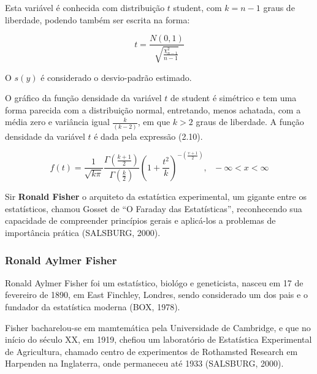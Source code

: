 Esta variável é conhecida com distribuição $t$ student, com $k=n-1$ graus de liberdade, podendo também ser escrita na forma:

\begin{equation}
    t =\frac{N(0,1)}{\sqrt{\frac{\chi^{2}_{n-1}}{n-1}}}
\end{equation}

O $s(y)$ é considerado o desvio-padrão estimado.\vskip0.3cm

O gráfico da função densidade da variável $t$ de student é simétrico e tem uma forma parecida com a distribuição normal, entretando, menos achatada, com a média zero e variância igual $\frac{k}{(k-2)}$, em que $k>2$ graus de liberdade. A função densidade da variável $t$ é dada pela expressão (2.10). 

\begin{equation}
f\left(t\right)=\frac{1}{\sqrt{k \pi}}\frac{\Gamma\left(\frac{k+1}{2}\right) }{\Gamma \left(\frac{k}{2}\right)}\left(1+\frac{t^2}{k}\right)^{-\left(\frac{\upsilon+1}{2}\right)},~~~-\infty<x<\infty
\end{equation}

Sir \textbf{Ronald Fisher} o arquiteto da estatística experimental, um gigante entre os estatísticos, chamou Gosset de “O Faraday das Estatísticas”, reconhecendo sua capacidade de compreender princípios gerais e aplicá-los a problemas de importância prática (SALSBURG, 2000).


\newpage
\subsubsection{Ronald Aylmer Fisher}

Ronald Aylmer Fisher foi um estatístico, biológo e geneticista, nasceu em 17 de fevereiro de 1890, em East Finchley, Londres, sendo considerado um dos pais e o fundador da estatística moderna (BOX, 1978).\vskip0.3cm


Fisher bacharelou-se em mamtemática pela Universidade de Cambridge, e que no início do século XX, em 1919, chefiou um laboratório de Estatística Experimental de Agricultura, chamado centro de experimentos de Rothamsted Research em Harpenden na Inglaterra, onde permaneceu até 1933 (SALSBURG, 2000).

\vspace{-1.2cm}

